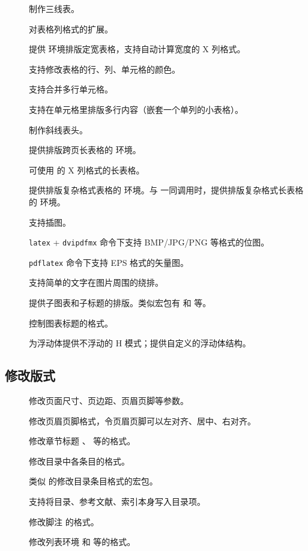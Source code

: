 \begin{description}
  \item[]  制作三线表。
  \item[]    对表格列格式的扩展。
  \item[] 提供  环境排版定宽表格，支持自动计算宽度的 X 列格式。
  \item[] 支持修改表格的行、列、单元格的颜色。
  \item[] 支持合并多行单元格。
  \item[] 支持在单元格里排版多行内容（嵌套一个单列的小表格）。
  \item[]  制作斜线表头。
  \item[] 提供排版跨页长表格的  环境。
  \item[] 可使用  的 X 列格式的长表格。
  \item[]     提供排版复杂格式表格的  环境。与  一同调用时，提供排版复杂格式长表格的  环境。
  \item[] 支持插图。
  \item[]  \texttt{latex} + \texttt{dvipdfmx} 命令下支持 BMP/JPG/PNG 等格式的位图。
  \item[] \texttt{pdflatex} 命令下支持 EPS 格式的矢量图。
  \item[]  支持简单的文字在图片周围的绕排。
  \item[]   提供子图表和子标题的排版。类似宏包有  和  等。
  \item[]  控制图表标题的格式。
  \item[]    为浮动体提供不浮动的 H 模式；提供自定义的浮动体结构。
\end{description}

\subsection{修改版式}\label{subsec:pkg-layout}

\begin{description}
  \item[] 修改页面尺寸、页边距、页眉页脚等参数。
  \item[] 修改页眉页脚格式，令页眉页脚可以左对齐、居中、右对齐。
  \item[] 修改章节标题 、 等的格式。
  \item[] 修改目录中各条目的格式。
  \item[]  类似  的修改目录条目格式的宏包。
  \item[] 支持将目录、参考文献、索引本身写入目录项。
  \item[] 修改脚注  的格式。
  \item[] 修改列表环境  和  等的格式。
\end{description}

\endinput